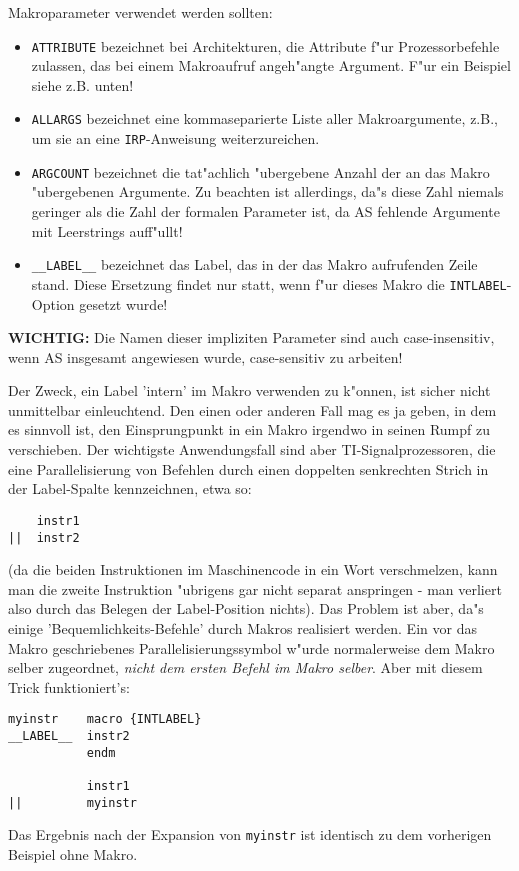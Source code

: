 \documentclass[12pt,a4paper,twoside]{report}
\begin{document}
Makroparameter verwendet werden sollten:
\begin{itemize}
\item{{\tt ATTRIBUTE} bezeichnet bei Architekturen, die Attribute f"ur
      Prozessorbefehle zulassen, das bei einem Makroaufruf angeh"angte
      Argument.  F"ur ein Beispiel siehe z.B. unten!}
\item{{\tt ALLARGS} bezeichnet eine kommaseparierte Liste aller
      Makroargumente, z.B., um sie an eine {\tt IRP}-Anweisung
      weiterzureichen.}
\item{{\tt ARGCOUNT} bezeichnet die tat"achlich "ubergebene Anzahl der
      an das Makro "ubergebenen Argumente.  Zu beachten ist allerdings,
      da"s diese Zahl niemals geringer als die Zahl der formalen Parameter
      ist, da AS fehlende Argumente mit Leerstrings auff"ullt!}
\item{{\tt \_\_LABEL\_\_} bezeichnet das Label, das in der das Makro aufrufenden
      Zeile stand.  Diese Ersetzung findet nur statt, wenn f"ur dieses
      Makro die {\tt INTLABEL}-Option gesetzt wurde!}
\end{itemize}
{\bf WICHTIG:} Die Namen dieser impliziten Parameter sind auch
case-insensitiv, wenn AS insgesamt angewiesen wurde, case-sensitiv
zu arbeiten!

Der Zweck, ein Label 'intern' im Makro verwenden zu k"onnen, ist sicher
nicht unmittelbar einleuchtend.  Den einen oder anderen Fall mag es ja
geben, in dem es sinnvoll ist, den Einsprungpunkt in ein Makro irgendwo
in seinen Rumpf zu verschieben.  Der wichtigste Anwendungsfall sind aber
TI-Signalprozessoren, die eine Parallelisierung von Befehlen durch einen
doppelten senkrechten Strich in der Label-Spalte kennzeichnen, etwa so:
\begin{verbatim}
    instr1
||  instr2
\end{verbatim}
(da die beiden Instruktionen im Maschinencode in ein Wort verschmelzen,
kann man die zweite Instruktion "ubrigens gar nicht separat anspringen -
man verliert also durch das Belegen der Label-Position nichts).  Das
Problem ist aber, da"s einige 'Bequemlichkeits-Befehle' durch Makros
realisiert werden.  Ein vor das Makro geschriebenes
Parallelisierungssymbol w"urde normalerweise dem Makro selber zugeordnet,
{\it nicht dem ersten Befehl im Makro selber}.  Aber mit diesem Trick
funktioniert's:
\begin{verbatim}
myinstr    macro {INTLABEL}
__LABEL__  instr2
           endm

           instr1
||         myinstr
\end{verbatim}
Das Ergebnis nach der Expansion von {\tt myinstr} ist identisch zu dem
vorherigen Beispiel ohne Makro.
\end{document}
